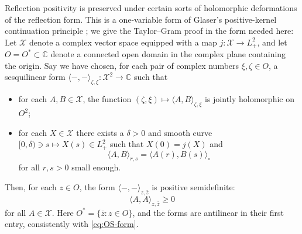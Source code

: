 \documentclass[11pt, letterpaper, reqno]{amsart}
\theoremstyle{definition}
\newenvironment{lemma}
{\pushQED{\qed}\renewcommand{\qedsymbol}{$\blacksquare$}\lemmax}
{\popQED\endlemmax}
\theoremstyle{remark}
\newcommand{\bbC}{\mathbb{C}}
\newcommand{\calX}{\mathcal{X}}
\begin{document}
Reflection positivity is preserved under certain sorts of holomorphic
deformations of the reflection form. This is a one-variable form of
Glaser's positive-kernel continuation principle \cite[Theorem~A]{Glaser};
we give the Taylor--Gram proof in the form needed here:
\begin{lemma}\label{lem:analytic-positivity}
Let $\calX$ denote a complex vector space equipped with a map
$j:\calX\to L_+^2$, and let $O=O^*\subset\bbC$ denote a connected
open domain in the complex plane containing the origin. Say we have
chosen, for each pair of complex numbers $\xi,\zeta\in O$, a
sesquilinear form $\langle-,-\rangle_{\zeta,\xi}:\calX^2\to\bbC$
such that
\begin{itemize}
\item for each $A,B\in\calX$, the function
$(\zeta,\xi)\mapsto\langle A,B\rangle_{\zeta,\xi}$ is jointly
holomorphic on $O^2$;
\item for each $X\in\calX$ there exists a $\delta>0$ and smooth
curve $[0,\delta)\ni s\mapsto X(s)\in L_+^2$ such that $X(0)=j(X)$
and
\begin{equation}
 \langle A,B\rangle_{r,s}=\langle A(r),B(s)\rangle_\circ
\end{equation}
for all $r,s>0$ small enough.
\end{itemize}
Then, for each $z\in O$, the form
$\langle-,-\rangle_{z,\bar z}$ is positive semidefinite:
\begin{equation}
 \langle A,A\rangle_{z,\bar z}\geq0
\end{equation}
for all $A\in\calX$.
\end{lemma}
Here $O^*=\{\bar z:z\in O\}$, and the forms are antilinear in their
first entry, consistently with \eqref{eq:OS-form}.
\end{document}
